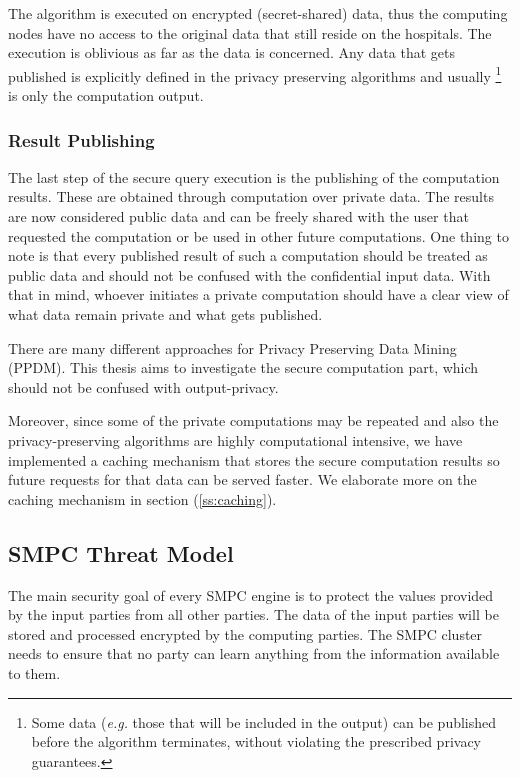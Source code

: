 The algorithm is executed on encrypted (secret\hyp shared) data, thus the computing nodes have no access to the original data that still reside on the hospitals.
The execution is oblivious as far as the data is concerned.
Any data that gets published is explicitly defined in the privacy preserving algorithms and usually \footnote{Some data (\textit{e.g.} those that will be included in the output) can be published before the algorithm terminates, without violating the prescribed privacy guarantees.} is only the computation output.

\subsubsection{Result Publishing}\label{sss:result-publishing}
The last step of the secure query execution is the publishing of the computation results.
These are obtained through computation over private data.
The results are now considered public data and can be freely shared with the user that requested the computation or be used in other future computations.
One thing to note is that every published result of such a computation should be treated as public data and should not be confused with the confidential input data.
With that in mind, whoever initiates a private computation should have a clear view of what data remain private and what gets published.

There are many different approaches for Privacy Preserving Data Mining (PPDM).
This thesis aims to investigate the secure computation part, which should not be confused with output\hyp privacy. 

Moreover, since some of the private computations may be repeated and also the privacy\hyp preserving algorithms are highly computational intensive, we have implemented a caching mechanism that stores the secure computation results so future requests for that data can be served faster.
We elaborate more on the caching mechanism in section (\ref{ss:caching}).




\subsection{SMPC Threat Model}\label{s:smpc-threat-model}
The main security goal of every SMPC engine is to protect the values provided by the input parties from all other parties.
The data of the input parties will be stored and processed encrypted by the computing parties.
The SMPC cluster needs to ensure that no party can learn anything from the information available to them.

